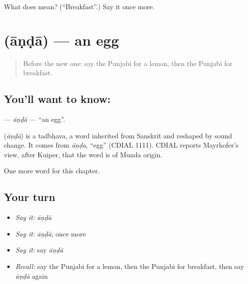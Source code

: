 \begin{tcolorbox}[breakable,colback=teal!4,colframe=teal!35!black,title={Before you move on}]
What does  mean? (\textquotedblleft{}Breakfast\textquotedblright{}.) Say it once more.
\end{tcolorbox}
\section[\texorpdfstring{\pa{ਆਂਡਾ} (āṇḍā)}{ਆਂਡਾ (āṇḍā)}]{ (āṇḍā) — an egg}

\label{lesson:PA-C67-anda}



\begin{quote}
Before the new one: say the Punjabi for a lemon, then the Punjabi for breakfast.
\end{quote}

\subsection*{You'll want to know: }
\textbf{} — \emph{āṇḍā} — \textquotedblleft{}an egg\textquotedblright{}.

\begin{cousinweb}
\textbf{} (\emph{āṇḍā}) is a tadbhava, a word inherited from Sanskrit and reshaped by sound change. It comes from \emph{āṇḍa}, \textquotedblleft{}egg\textquotedblright{} (CDIAL 1111). CDIAL reports Mayrhofer's view, after Kuiper, that the word is of Munda origin.
\end{cousinweb}

\begin{grammarlens}[title={What you've built}]
One more word for this chapter.
\end{grammarlens}

\subsection*{Your turn}
\begin{itemize}
\raggedright
  \item \emph{Say it:} \emph{āṇḍā}
  \item \emph{Say it:} \emph{āṇḍā}, once more
  \item \emph{Say it:} say \emph{āṇḍā}
  \item \emph{Recall:} say the Punjabi for a lemon, then the Punjabi for breakfast, then say \emph{āṇḍā} again
\end{itemize}

